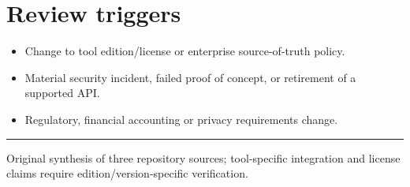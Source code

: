 \documentclass[10pt,letterpaper]{article}
\begin{document}
\section{Review triggers}
\begin{itemize}
\item Change to tool edition/license or enterprise source-of-truth policy.
\item Material security incident, failed proof of concept, or retirement of a supported API.
\item Regulatory, financial accounting or privacy requirements change.
\end{itemize}
\vfill\noindent\color{muted}\rule{\linewidth}{0.4pt}\par\scriptsize Original synthesis of three repository sources; tool-specific integration and license claims require edition/version-specific verification.\normalsize
\end{document}

